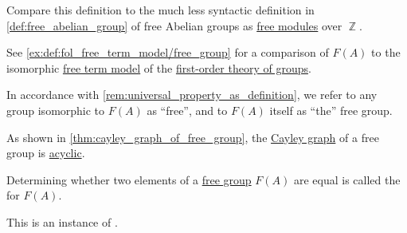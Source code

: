 \begin{comments}
  \item Compare this definition to the much less syntactic definition in \cref{def:free_abelian_group} of free Abelian groups as \hyperref[def:free_semimodule]{free modules} over \( \BbbZ \).

  \item See \cref{ex:def:fol_free_term_model/free_group} for a comparison of \( F(A) \) to the isomorphic \hyperref[def:fol_free_term_model]{free term model} of the \hyperref[def:group/theory]{first-order theory of groups}.

  \item In accordance with \cref{rem:universal_property_as_definition}, we refer to any group isomorphic to \( F(A) \) as \enquote{free}, and to \(F(A) \) itself as \enquote{the} free group.

  \item As shown in \cref{thm:cayley_graph_of_free_group}, the \hyperref[def:cayley_graph]{Cayley graph} of a free group is \hyperref[def:acyclic_graph]{acyclic}.
\end{comments}

\begin{problem}\label{prob:word_problem_for_groups}
  Determining whether two elements of a \hyperref[def:free_group]{free group} \( F(A) \) are equal is called the  for \( F(A) \).
\end{problem}
\begin{comments}
  \item This is an instance of .
\end{comments}

